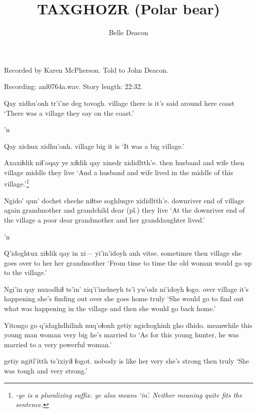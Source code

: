 \documentclass[12pt]{article}
\begin{document}
\title{TAXGHOZR \newline (Polar bear)}
\author{Belle Deacon}
\date{}

\maketitle

Recorded by Karen McPherson. Told to John Deacon.

Recording: anl0764a.wav. Story length:  22:32.

\bigskip

\gll Qay xidhu'onh tr'i'ne deg tovogh.
village {there is} {it's said} {around here} coast 
\glt `There was a village they say on the coast.' 
\glend

'n

\gll Qay xichux xidhu'onh.
village big {it is}
\glt `It was a big village.'
\glend

\gll Axaxiɬdik niɬ'oqay ye xiɬdik qay xinedr xididltth'e.
then    {husband and wife} {} then village middle {they live}
\glt `And a husband and wife lived in the middle of this village.'\footnote{\em -ye \em is a pluralizing suffix.  \em ye \em also means `in'. Neither meaning quite fits the sentence.}
\glend

\gll Ngido' {qun' dochet} cheche  niɬtse soghluqye xididltth'e. 
downriver {end of village} again {grandmother and grandchild} {dear (pl.)} {they live}
\glt `At the downriver end of the village a poor dear grandmother and her granddaughter lived.' 
\glend

'n

\gll Q'idoghtux xiɬdik qay {in xi---} yi'in'idoyh anh vitse. 
sometimes then village  {} {she goes over to} her {her grandmother}
\glt `From time to time the old woman would go up to the village.' 
\glend

\gll Ngi'in qay nuxodhiɬ ts'in' xiq'i'inelneyh ts'i yu'odz ni'idoyh {ɬogo}. 
over village {it's happening} {} {she's finding out} {} {over} {she goes home} truly 
\glt `She would go to find out what was happening in the village and then she would go back home.'
\glend

\gll Yitongo go q'idaghdhilinh nuq'oɬonh getiy ngichoghinh {gho dhido.} 
meanwhile this {young man} woman very big {he's married to}
\glt `As for this young hunter, he was married to a very powerful woman.'
\glend

  getiy ngitl'itth ts'ixiyiɬ {ɬogot}. 
{nobody is like her} very {she's strong} then truly
\glt `She was tough and very strong.' 
\glend
\end{document}
